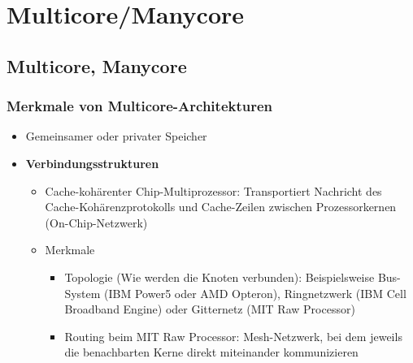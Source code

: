 \section{Multicore/Manycore}

\subsection{Multicore, Manycore}

\subsubsection{Merkmale von Multicore-Architekturen}
\begin{itemize}
	\item Gemeinsamer oder privater Speicher
	\item \textbf{Verbindungsstrukturen}
	\begin{itemize}
		\item Cache-kohärenter Chip-Multiprozessor: Transportiert Nachricht des Cache-Kohärenzprotokolls und Cache-Zeilen zwischen Prozessorkernen (On-Chip-Netzwerk)
		\item Merkmale
		\begin{itemize}
			\item Topologie (Wie werden die Knoten verbunden): Beispielsweise Bus-System (IBM Power5 oder AMD Opteron), Ringnetzwerk (IBM Cell Broadband Engine) oder Gitternetz (MIT Raw Processor)
			\item Routing beim MIT Raw Processor: Mesh-Netzwerk, bei dem jeweils die benachbarten Kerne direkt miteinander kommunizieren
		\end{itemize}
	\end{itemize}
\end{itemize}

